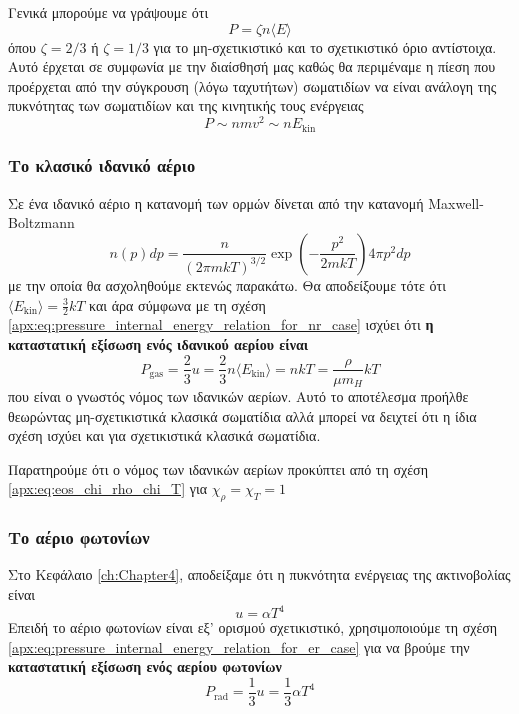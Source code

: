 Γενικά μπορούμε να γράψουμε ότι 
\begin{equation}
    P = \zeta n \langle E \rangle
\end{equation}
όπου $\zeta = 2/3$ ή $\zeta = 1/3$ για το μη-σχετικιστικό και το σχετικιστικό όριο αντίστοιχα. Αυτό έρχεται σε συμφωνία με την διαίσθησή μας καθώς θα περιμέναμε η πίεση που προέρχεται από την σύγκρουση (λόγω ταχυτήτων) σωματιδίων να είναι ανάλογη της πυκνότητας των σωματιδίων και της κινητικής τους ενέργειας
\begin{equation*}
    P \sim n mv^2 \sim n E_{\text{kin}}
\end{equation*}


\subsubsection{Το κλασικό ιδανικό αέριο}
Σε ένα ιδανικό αέριο η κατανομή των ορμών δίνεται από την κατανομή Maxwell-Boltzmann
\begin{equation}
    n(p) dp = \frac{n}{(2\pi m kT)^{3/2}} \exp\left(- \frac{p^2}{2mkT}\right) 4\pi p^2 dp
\end{equation}
με την οποία θα ασχοληθούμε εκτενώς παρακάτω. Θα αποδείξουμε τότε ότι $\langle E_{\text{kin}} \rangle = \frac{3}{2} kT $ και άρα σύμφωνα με τη σχέση \eqref{apx:eq:pressure_internal_energy_relation_for_nr_case} ισχύει ότι\textbf{ η καταστατική εξίσωση ενός ιδανικού αερίου είναι}
\begin{equation}
    \boxed{P_{\text{gas}} = \frac{2}{3}u = \frac{2}{3} n \langle E_{\text{kin}} \rangle = nkT = \frac{\rho}{\mu m_H}kT}
\end{equation}
που είναι ο γνωστός νόμος των ιδανικών αερίων. Αυτό το αποτέλεσμα προήλθε θεωρώντας μη-σχετικιστικά κλασικά σωματίδια αλλά μπορεί να δειχτεί ότι η ίδια σχέση ισχύει και για σχετικιστικά κλασικά σωματίδια.

Παρατηρούμε ότι ο νόμος των ιδανικών αερίων προκύπτει από τη σχέση \eqref{apx:eq:eos_chi_rho_chi_T} για $\chi_\rho = \chi_T = 1$


\subsubsection{Το αέριο φωτονίων}
Στο Κεφάλαιο \ref{ch:Chapter4}, αποδείξαμε ότι η πυκνότητα ενέργειας της ακτινοβολίας είναι
\begin{equation}
    u = \alpha T^4
\end{equation}
Επειδή το αέριο φωτονίων είναι εξ' ορισμού σχετικιστικό, χρησιμοποιούμε τη σχέση \eqref{apx:eq:pressure_internal_energy_relation_for_er_case} για να βρούμε την \textbf{καταστατική εξίσωση ενός αερίου φωτονίων}
\begin{equation}
    \boxed{P_{\text{rad}} = \frac{1}{3}u = \frac{1}{3} \alpha T^4}
\end{equation}

